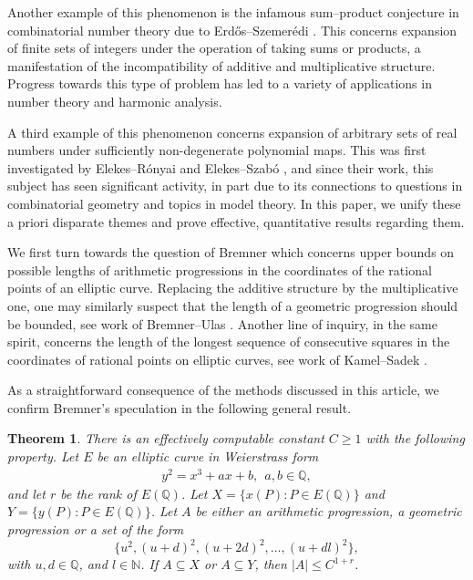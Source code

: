 \documentclass[12pt, reqno]{amsart}
\newtheorem{thm}[theorem]{Theorem}
\theoremstyle{remark}
\theoremstyle{definition}
\numberwithin{equation}{section}
\begin{document}
 Another example of this phenomenon is the infamous sum--product conjecture in combinatorial number theory due to Erd\H{o}s--Szemer\'{e}di \cite{Erdos--Szemeredi_on_sums_of_and_products_of_integers}. This concerns expansion of finite sets of integers under the operation of taking sums or products, a manifestation of the incompatibility of additive and multiplicative structure. Progress towards this type of problem has led to a variety of applications in number theory and harmonic analysis. 
 
 A third example of this phenomenon concerns expansion of arbitrary sets of real numbers under sufficiently non-degenerate polynomial maps. This was first investigated by Elekes--R\'{o}nyai \cite{ER2000} and Elekes--Szab\'{o} \cite{ES2012}, and since their work, this subject has seen significant activity, in part due to its connections to questions in combinatorial geometry and topics in model theory. In this paper, we unify these a priori disparate themes and prove effective, quantitative results regarding them.
 
 
 We first turn towards the question of Bremner which concerns upper bounds on possible lengths of arithmetic progressions in the coordinates of the rational points of an elliptic curve. Replacing the additive structure by the multiplicative one, one may similarly suspect that the length of a geometric progression should be bounded, see work of Bremner--Ulas \cite{Brmenergeom}. Another line of inquiry, in the same spirit, concerns the length of the longest sequence of consecutive squares in the coordinates of rational points on elliptic curves, see work of Kamel--Sadek  \cite{Kamelsquares}.
 
 As a straightforward consequence of the methods discussed in this article, we confirm Bremner's speculation \cite[\S5]{Bremner} in the following general result. 

 
 \begin{thm} \label{thmBremner} There is an effectively computable constant $C \geq 1$ with the following property. Let $E$ be an elliptic curve in Weierstrass form 
 \begin{align}\label{Weierstrass}
      y^2 = x^3 + ax + b,~~  a,b \in \mathbb{Q},
 \end{align}
 and let $r$ be the rank of $E(\mathbb{Q})$. Let $X = \{x(P): P \in E(\mathbb{Q})\}$ and $Y = \{y(P): P \in E(\mathbb{Q})\}$. Let $A$ be either an arithmetic progression, a geometric progression or a set of the form 
 \[ \{ u^2, (u+d)^2, (u+2d)^2, \dots, (u+dl)^2 \}, \]
 with $u,d\in \mathbb{Q}$, and $l \in \mathbb{N}$. If $A \subseteq X$ or $A \subseteq Y$, then $|A| \leq C^{1 +r}$.
\end{thm}
\end{document}
